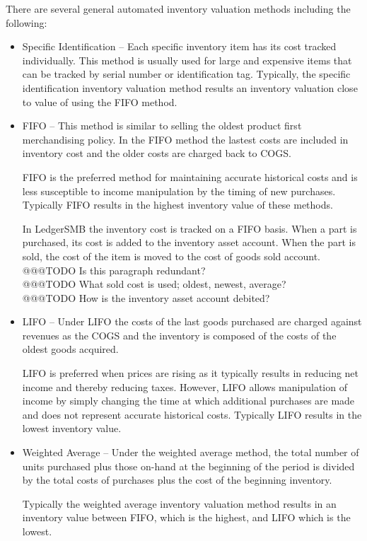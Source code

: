 There are several general automated inventory valuation methods including the following:
\begin{itemize}
        \item Specific Identification -- Each specific inventory item has its cost tracked individually. 
        This method is usually used for large and expensive items that can be tracked by 
        serial number or identification tag. 
        Typically, the specific identification inventory valuation method results an inventory valuation
        close to value of using the \gls{FIFO} method.
        \item \gls{FIFO} -- This method is similar to selling the oldest product first merchandising policy.
        In the \gls{FIFO} method the lastest costs are included in inventory cost and the older costs
        are charged back to \gls{COGS}.

        \gls{FIFO} is the preferred method for maintaining accurate historical costs and is less 
        susceptible to income manipulation by the timing of new purchases. Typically \gls{FIFO}
        results in the highest inventory value of these methods.
        
        In LedgerSMB the inventory cost is tracked on a \gls{FIFO} basis. When a part is purchased, 
        its cost is added to the inventory asset account. When the part is sold, the cost of the item
        is moved to the cost of goods sold account.\\
        @@@TODO Is this paragraph redundant?\\
        @@@TODO  What sold cost is used; oldest, newest, average?\\
        @@@TODO How is the inventory asset account debited?
        \item \gls{LIFO} --  Under \gls{LIFO} the costs of the last goods purchased are charged
        against revenues as the \gls{COGS} and the inventory is composed of the costs
        of the oldest goods acquired.
        
        \gls{LIFO} is preferred when prices are rising as it typically results in reducing net income and
        thereby reducing taxes. However, \gls{LIFO} allows manipulation of income by simply changing the time
        at which additional purchases are made and does not represent accurate historical costs. 
        Typically \gls{LIFO} results in the lowest inventory value.
        
        \item Weighted Average -- Under the weighted average method, the total number of units 
        purchased plus those on-hand at the beginning of the period is divided by the total costs
        of purchases plus the cost of the beginning inventory.
        
        Typically the weighted average inventory valuation method results in 
        an inventory value between \gls{FIFO}, which is the highest,
        and \gls{LIFO} which is the lowest.
\end{itemize}

 
